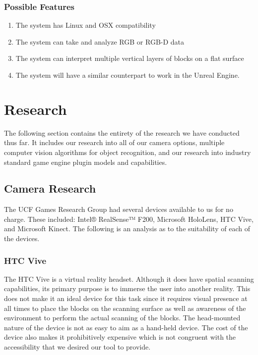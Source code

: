 \documentclass[12pt]{article}
\providecommand{\tightlist}{%
  \setlength{\itemsep}{0pt}\setlength{\parskip}{0pt}}
\begin{document}
\subsubsection{Possible Features}\label{possible-features}

\begin{enumerate}
\def\labelenumi{\arabic{enumi}.}
\tightlist
\item
  The system has Linux and OSX compatibility
\item
  The system can take and analyze RGB or RGB-D data
\item
  The system can interpret multiple vertical layers of blocks on a flat
  surface
\item
  The system will have a similar counterpart to work in the Unreal
  Engine.
\end{enumerate}

\section{Research}\label{research}

The following section contains the entirety of the research we have
conducted thus far. It includes our research into all of our camera
options, multiple computer vision algorithms for object recognition, and
our research into industry standard game engine plugin models and
capabilities.

\subsection{Camera Research}\label{camera-research}

The UCF Games Research Group had several devices available to us for no
charge. These included: Intel® RealSense™ F200, Microsoft HoloLens, HTC
Vive, and Microsoft Kinect. The following is an analysis as to the
suitability of each of the devices.

\subsubsection{HTC Vive}\label{htc-vive}

The HTC Vive is a virtual reality headset. Although it does have spatial
scanning capabilities, its primary purpose is to immerse the user into
another reality. This does not make it an ideal device for this task
since it requires visual presence at all times to place the blocks on
the scanning surface as well as awareness of the environment to perform
the actual scanning of the blocks. The head-mounted nature of the device
is not as easy to aim as a hand-held device. The cost of the device also
makes it prohibitively expensive which is not congruent with the
accessibility that we desired our tool to provide.
\end{document}
